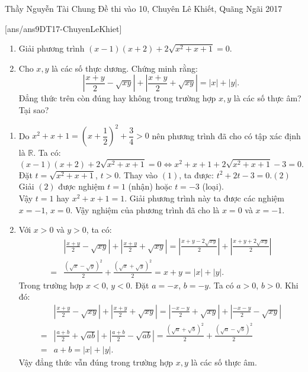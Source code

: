 \begin{name}
{Thầy  Nguyễn Tài Chung}
{Đề thi vào 10, Chuyên Lê Khiết, Quãng Ngãi 2017}
\end{name}
\setcounter{ex}{0}
[ans/ans9DT17-ChuyenLeKhiet]
\begin{ex}%
    \hfill
    \begin{enumerate}
        \item Giải phương trình $\left( x-1 \right)\left( x+2 \right)+2\sqrt{x^2+x+1}=0$. 
        \item  Cho $x, y$ là các số thực dương. Chứng minh rằng: 
        \[\left| \frac{x+y}{2}-\sqrt{xy} \right|+\left| \frac{x+y}{2}+\sqrt{xy} \right|=\left| x \right|+\left| y \right|.\]
        Đẳng thức trên còn đúng hay không trong trường hợp $x, y$ là các số thực âm? Tại sao?
    \end{enumerate}
\loigiai
    {
    \begin{enumerate}
        \item Do ${x^2} + x + 1 = {\left( {x + \dfrac{1}{2}} \right)^2} + \dfrac{3}{4} > 0$ nên phương trình đã cho có tập xác định là $\mathbb{R}$. Ta có:
        \[\left( x-1 \right)\left( x+2 \right)+2\sqrt{{{x}^{2}}+x+1}=0\Leftrightarrow {{x}^{2}}+x+1+2\sqrt{{{x}^{2}}+x+1}-3=0.\tag{1}\]
        Đặt $t=\sqrt{{{x}^{2}}+x+1}$, $t>0$. Thay vào $(1)$, ta được: ${{t}^{2}}+2t-3=0$.\hfill$(2)$\\
        Giải $(2)$ được nghiệm $t=1$ (nhận) hoặc $t=-3$ (loại).\\
        Vậy $t=1$ hay $x^2+x+1=1$. Giải phương trình này ta được các nghiệm $x=-1$, $x=0$. Vậy nghiệm của phương trình đã cho là $x=0$ và $x=-1$.
        \item Với $x>0$ và $y>0$, ta có:
        {\allowdisplaybreaks
        \begin{align*}
        & \left| \frac{x+y}{2}-\sqrt{xy} \right|+\left| \frac{x+y}{2}+\sqrt{xy} \right|=\left| \frac{x+y-2\sqrt{xy}}{2} \right|+\left| \frac{x+y+2\sqrt{xy}}{2} \right| \\ 
         =&\frac{{{\left( \sqrt{x}-\sqrt{y} \right)}^{2}}}{2}+\frac{{{\left( \sqrt{x}+\sqrt{y} \right)}^{2}}}{2}=x+y=\left| x \right|+\left| y \right|.
        \end{align*}}Trong trường hợp $x<0$, $y<0$.  Đặt $a=-x$, $b=-y$. Ta có $a>0$, $b>0$.
        Khi đó:
        {\allowdisplaybreaks
        \begin{align*}
        & \left| \frac{x+y}{2}-\sqrt{xy} \right|+\left| \frac{x+y}{2}+\sqrt{xy} \right|=\left| \frac{-x-y}{2}+\sqrt{xy} \right|+\left| \frac{-x-y}{2}-\sqrt{xy} \right| \\ 
         =&\left| \frac{a+b}{2}+\sqrt{ab} \right|+\left| \frac{a+b}{2}-\sqrt{ab} \right|=\frac{{{\left( \sqrt{a}+\sqrt{b} \right)}^{2}}}{2}+\frac{{{\left( \sqrt{a}-\sqrt{b} \right)}^{2}}}{2} \\ 
        =&a+b=\left| x \right|+\left| y \right|. 
        \end{align*}}Vậy đẳng thức vẫn đúng trong trường hợp $x, y$ là các số thực âm.        
    \end{enumerate}
    }
\end{ex}

